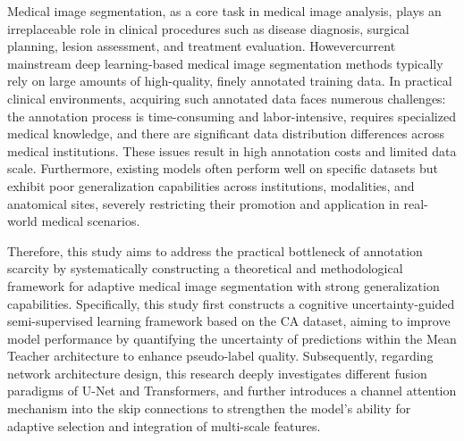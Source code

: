 Medical image segmentation, as a core task in medical image analysis, plays an irreplaceable role in clinical procedures such as disease diagnosis, surgical planning, lesion assessment, and treatment evaluation. Howevercurrent mainstream deep learning-based medical image segmentation methods typically rely on large amounts of high-quality, finely annotated training data. In practical clinical environments, acquiring such annotated data faces numerous challenges: the annotation process is time-consuming and labor-intensive, requires specialized medical knowledge, and there are significant data distribution differences across medical institutions. These issues result in high annotation costs and limited data scale. Furthermore, existing models often perform well on specific datasets but exhibit poor generalization capabilities across institutions, modalities, and anatomical sites, severely restricting their promotion and application in real-world medical scenarios.

Therefore, this study aims to address the practical bottleneck of annotation scarcity by systematically constructing a theoretical and methodological framework for adaptive medical image segmentation with strong generalization capabilities. Specifically, this study first constructs a cognitive uncertainty-guided semi-supervised learning framework based on the CA dataset, aiming to improve model performance by quantifying the uncertainty of predictions within the Mean Teacher architecture to enhance pseudo-label quality. Subsequently, regarding network architecture design, this research deeply investigates different fusion paradigms of U-Net and Transformers, and further introduces a channel attention mechanism into the skip connections to strengthen the model's ability for adaptive selection and integration of multi-scale features.
